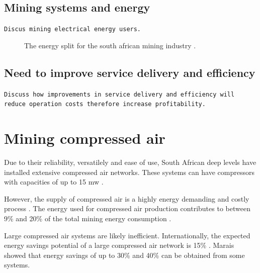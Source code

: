 \subsection{Mining systems and energy}
\texttt{Discus mining electrical energy users.} 
\begin{figure}[h]
	\centering
	\caption[The energy split for the south african mining industry.]{The energy split for the south african mining industry \cite{Eskom2010Energy}.}
	\label{fig: Energy Split}
\end{figure}
\par
\subsection{Need to improve service delivery and efficiency}
\texttt{Discuss how improvements in service delivery and efficiency will reduce operation costs therefore increase profitability.}
\section{Mining compressed air}
Due to their reliability, versatilely and ease of use, South African deep levels have installed extensive compressed air networks. These systems can have compressors with capacities of up to 15 \gls{mw} \cite{Marais2012PhD}.\par
However, the supply of compressed air is a highly energy demanding and costly process \cite{padachi2009energy}.  The energy used for compressed air production contributes to between 9\% and 20\% of the total mining energy consumption \cite{Eskom2010Energy,du2011development}. \par
Large compressed air systems are likely inefficient. Internationally, the expected energy savings potential of a large compressed air network is 15\% \cite{neale2009compressed}. Marais \cite{marais2013simplification} showed that energy savings of up to 30\% and 40\% can be obtained from some systems. 
